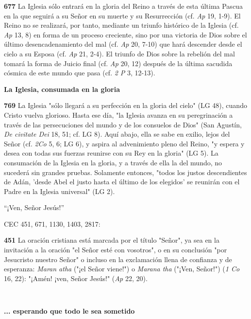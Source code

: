 \textbf{677} La Iglesia sólo entrará en la gloria del Reino a través de esta última Pascua en la que seguirá a su Señor en su muerte y su Resurrección (cf. \emph{Ap} 19, 1-9). El Reino no se realizará, por tanto, mediante un triunfo histórico de la Iglesia (cf. \emph{Ap} 13, 8) en forma de un proceso creciente, sino por una victoria de Dios sobre el último desencadenamiento del mal (cf. \emph{Ap} 20, 7-10) que hará descender desde el cielo a su Esposa (cf. \emph{Ap} 21, 2-4). El triunfo de Dios sobre la rebelión del mal tomará la forma de Juicio final (cf. \emph{Ap} 20, 12) después de la última sacudida cósmica de este mundo que pasa (cf. \emph{2 P} 3, 12-13).

\textbf{La Iglesia, consumada en la gloria}

\textbf{769} La Iglesia "sólo llegará a su perfección en la gloria del cielo" (LG 48), cuando Cristo vuelva glorioso. Hasta ese día, "la Iglesia avanza en su peregrinación a través de las persecuciones del mundo y de los consuelos de Dios" (San Agustín, \emph{De civitate Dei} 18, 51; cf. LG 8). Aquí abajo, ella se sabe en exilio, lejos del Señor (cf. \emph{2Co} 5, 6; LG 6), y aspira al advenimiento pleno del Reino, "y espera y desea con todas sus fuerzas reunirse con su Rey en la gloria" (LG 5). La consumación de la Iglesia en la gloria, y a través de ella la del mundo, no sucederá sin grandes pruebas. Solamente entonces, "todos los justos descendientes de Adán, 'desde Abel el justo hasta el último de los elegidos' se reunirán con el Padre en la Iglesia universal" (LG 2).

``¡Ven, Señor Jesús!''

CEC 451, 671, 1130, 1403, 2817:

\textbf{451} La oración cristiana está marcada por el título "Señor", ya sea en la invitación a la oración "el Señor esté con vosotros", o en su conclusión "por Jesucristo nuestro Señor" o incluso en la exclamación llena de confianza y de esperanza: \emph{Maran atha} ("¡el Señor viene!") o \emph{Marana tha} ("¡Ven, Señor!") (\emph{1 Co} 16, 22): "¡Amén! ¡ven, Señor Jesús!" (\emph{Ap} 22, 20).

\textbf{\\ }

\textbf{... esperando que todo le sea sometido}

